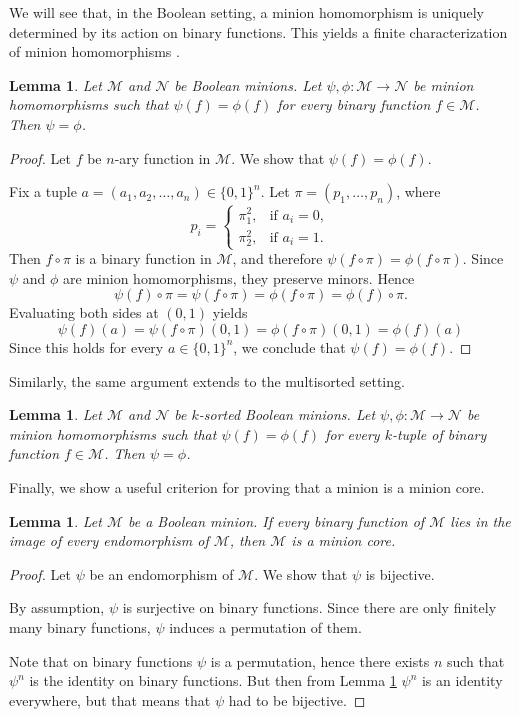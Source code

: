 \documentclass{amsart}
\numberwithin{equation}{section}
\theoremstyle{plain}
\newtheorem{lemma}[theorem]{Lemma}
\theoremstyle{definition}
\def\minion#1{\mathcal{#1}}
\begin{document}
We will see that, in the Boolean setting, a minion homomorphism is uniquely determined by its action on binary functions. This yields a finite characterization of minion homomorphisms \cite{kapytka}.


\begin{lemma}
  \label{bin-equal}
Let $\minion{M}$ and $\minion{N}$ be Boolean minions. Let $\psi,\phi\colon \minion{M}\to\minion{N}$ be minion homomorphisms such that $\psi(f)=\phi(f)$ for every binary function $f\in\minion{M}$. Then $\psi=\phi$.
\end{lemma}
\begin{proof}
  Let $f$ be $n$-ary function in $\minion{M}$. We show that $\psi(f)=\phi(f)$. 
  
  Fix a tuple $a=(a_1,a_2,\dots,a_n)\in\{0,1\}^n$. 
  Let $\pi=(p_1,\dots,p_n)$, where 
  $$p_i= \begin{cases} \pi_1^2,& \text{if } a_i=0,\\ \pi_2^2,& \text{if } a_i=1. \end{cases} $$
  Then $f\circ\pi$ is a binary function in $\minion{M}$, and therefore $\psi(f\circ\pi)=\phi(f\circ\pi)$. 
  Since $\psi$ and $\phi$ are minion homomorphisms, they preserve minors. Hence
  $$\psi(f)\circ\pi = \psi(f\circ\pi) = \phi(f\circ\pi) = \phi(f)\circ\pi.$$ Evaluating both sides at $(0,1)$ yields
  $$\psi(f)(a) = \psi(f\circ\pi)(0,1) = \phi(f\circ\pi)(0,1) = \phi(f)(a)$$
Since this holds for every $a\in\{0,1\}^n$, we conclude that $\psi(f)=\phi(f)$. 
\end{proof}

Similarly, the same argument extends to the multisorted setting.

\begin{lemma}
Let $\minion{M}$ and $\minion{N}$ be $k$-sorted Boolean minions. Let $\psi,\phi\colon\minion{M}\to\minion{N}$ be minion homomorphisms such that
 $\psi(f)=\phi(f)$ for every $k$-tuple of binary function $f\in\minion{M}$. Then $\psi=\phi$.
\end{lemma}

Finally, we show a useful criterion for proving that a minion is a minion core.

\begin{lemma}
  Let $\minion{M}$ be a Boolean minion. If every binary function of $\minion{M}$ lies in the image of every endomorphism of $\minion{M}$, then $\minion{M}$ is a minion core.
\end{lemma}
\begin{proof}
  Let $\psi$ be an endomorphism of $\minion{M}$. We show that $\psi$ is bijective.

  By assumption, $\psi$ is surjective on binary functions. Since there are only finitely many binary functions, $\psi$ induces a permutation of them.

  Note that on binary functions $\psi$ is a permutation, hence there exists $n$ such that $\psi^n$ is the identity on binary functions. But then from Lemma \ref{bin-equal} $\psi^n$ is an identity everywhere, but that means that $\psi$ had to be bijective.  
\end{proof}
\end{document}
